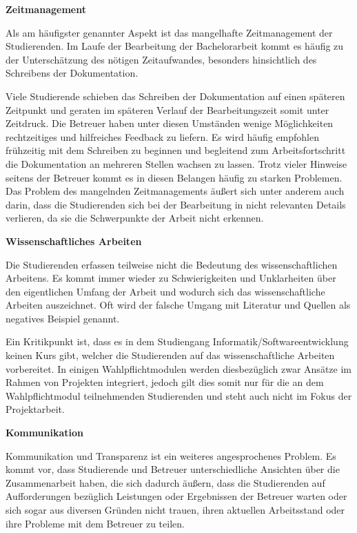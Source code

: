 \documentclass[bibliography=totoc,listof=totoc,BCOR=5mm,DIV=12,oneside]{scrbook}
\begin{document}
\par \bigskip \textbf{Zeitmanagement}
\par Als am häufigster genannter Aspekt ist das mangelhafte Zeitmanagement der Studierenden. Im Laufe der Bearbeitung der Bachelorarbeit kommt es häufig zu der Unterschätzung des nötigen  Zeitaufwandes, besonders hinsichtlich des Schreibens der Dokumentation. 
\par Viele Studierende schieben das Schreiben der Dokumentation auf einen späteren Zeitpunkt und geraten im späteren Verlauf der Bearbeitungszeit somit unter Zeitdruck. Die Betreuer haben unter diesen Umständen wenige Möglichkeiten rechtzeitiges und hilfreiches Feedback zu liefern. Es wird häufig empfohlen frühzeitig mit dem Schreiben zu beginnen und begleitend zum Arbeitsfortschritt die Dokumentation an mehreren Stellen wachsen zu lassen. Trotz vieler Hinweise seitens der Betreuer kommt es in diesen Belangen häufig zu starken Problemen.
Das Problem des mangelnden Zeitmanagements äußert sich unter anderem auch darin, dass die Studierenden sich bei der Bearbeitung in nicht relevanten Details verlieren, da sie die Schwerpunkte der Arbeit nicht erkennen.
\par \bigskip \textbf{Wissenschaftliches Arbeiten}
\par Die Studierenden erfassen teilweise nicht die Bedeutung des wissenschaftlichen Arbeitens. Es kommt immer wieder zu Schwierigkeiten und Unklarheiten über den eigentlichen Umfang der Arbeit und wodurch sich das wissenschaftliche Arbeiten auszeichnet. Oft wird der falsche Umgang mit Literatur und Quellen als negatives Beispiel genannt.
\par Ein Kritikpunkt ist, dass es in dem Studiengang Informatik/Softwareentwicklung keinen Kurs gibt, welcher die Studierenden auf das wissenschaftliche Arbeiten vorbereitet. In einigen Wahlpflichtmodulen werden diesbezüglich zwar Ansätze im Rahmen von Projekten integriert, jedoch gilt dies somit nur für die an dem Wahlpflichtmodul teilnehmenden Studierenden und steht auch nicht im Fokus der Projektarbeit.
\par \bigskip \textbf{Kommunikation}
\par Kommunikation und Transparenz ist ein weiteres angesprochenes Problem. Es kommt vor, dass Studierende und Betreuer unterschiedliche Ansichten über die Zusammenarbeit haben, die sich dadurch äußern, dass die Studierenden auf Aufforderungen bezüglich Leistungen oder Ergebnissen der Betreuer warten oder sich sogar aus diversen Gründen nicht trauen, ihren aktuellen Arbeitsstand oder ihre Probleme mit dem Betreuer zu teilen. 
\end{document}
